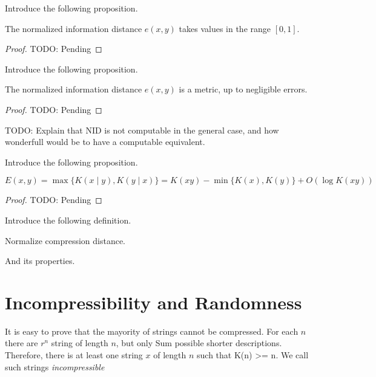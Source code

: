 {\color{red} Introduce the following proposition.}

\begin{proposition}
The normalized information distance $e(x, y)$ takes values in the range $[0, 1]$.
\end{proposition}
\begin{proof}
{\color{red} TODO: Pending}
\end{proof}

{\color{red} Introduce the following proposition.}

\begin{proposition}
The normalized information distance $e(x, y)$ is a metric, up to negligible errors.
\end{proposition}
\begin{proof}
{\color{red} TODO: Pending}
\end{proof}

{\color{red} TODO: Explain that NID is not computable in the general case, and how wonderfull would be to have a computable equivalent.}

{\color{red} Introduce the following proposition.}

\begin{proposition}
\[
E(x, y) = \max\{ K(x \mid y), K(y \mid x) \} = K(xy) - \min\{ K(x), K(y) \} + O(\log K(xy) )
\]
\end{proposition}
\begin{proof}
{\color{red} TODO: Pending}
\end{proof}

{\color{red} Introduce the following definition.}

\begin{definition}
Normalize compression distance.
\end{definition}

{\color{red} And its properties.}


%
%

\section{Incompressibility and Randomness}
\label{sec:incompressibility_randomness}



It is easy to prove that the mayority of strings cannot be compressed. For each $n$ there are $r^n$ string of length $n$, but only Sum possible shorter descriptions. Therefore, there is at least one string $x$ of length $n$ such that K(n) >= n. We call such strings \emph{incompressible}

